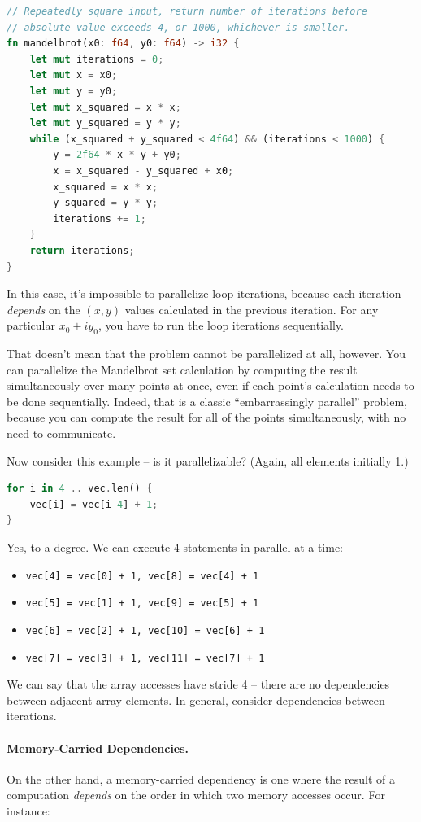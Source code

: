 \begin{lstlisting}[language=Rust]
// Repeatedly square input, return number of iterations before
// absolute value exceeds 4, or 1000, whichever is smaller.
fn mandelbrot(x0: f64, y0: f64) -> i32 {
    let mut iterations = 0;
    let mut x = x0;
    let mut y = y0;
    let mut x_squared = x * x;
    let mut y_squared = y * y;
    while (x_squared + y_squared < 4f64) && (iterations < 1000) {
        y = 2f64 * x * y + y0;
        x = x_squared - y_squared + x0;
        x_squared = x * x;
        y_squared = y * y;
        iterations += 1;
    }
    return iterations;
}
\end{lstlisting}
In this case, it's impossible to parallelize loop iterations, because
each iteration \emph{depends} on the $(x, y)$ values calculated in the
previous iteration. For any particular $x_0 + iy_0$, you have to run the
loop iterations sequentially.

That doesn't mean that the problem cannot be parallelized at all, however.
You can parallelize the Mandelbrot set calculation
by computing the result simultaneously over many points at
once, even if each point's calculation needs to be done sequentially.
Indeed, that is a classic ``embarrassingly parallel'' problem,
because you can compute the result for all of the points
simultaneously, with no need to communicate.

 Now consider this example -- is it parallelizable? (Again, all elements initially 1.)

\begin{lstlisting}[language=Rust]
for i in 4 .. vec.len() {
    vec[i] = vec[i-4] + 1;
}
\end{lstlisting}

Yes, to a degree. We can execute 4 statements in parallel at a time:
\begin{itemize}
  \item \texttt{vec[4] = vec[0] + 1, vec[8] = vec[4] + 1}
  \item \texttt{vec[5] = vec[1] + 1, vec[9] = vec[5] + 1}
  \item \texttt{vec[6] = vec[2] + 1, vec[10] = vec[6] + 1}
  \item \texttt{vec[7] = vec[3] + 1, vec[11] = vec[7] + 1}
\end{itemize}  
We can say that the array accesses have stride 4 -- there are no
dependencies between adjacent array elements. In general, consider
dependencies between iterations.


\paragraph{Memory-Carried Dependencies.} On the other hand, a memory-carried dependency is one where the result
of a computation \emph{depends} on the order in which two memory accesses
occur. For instance:

